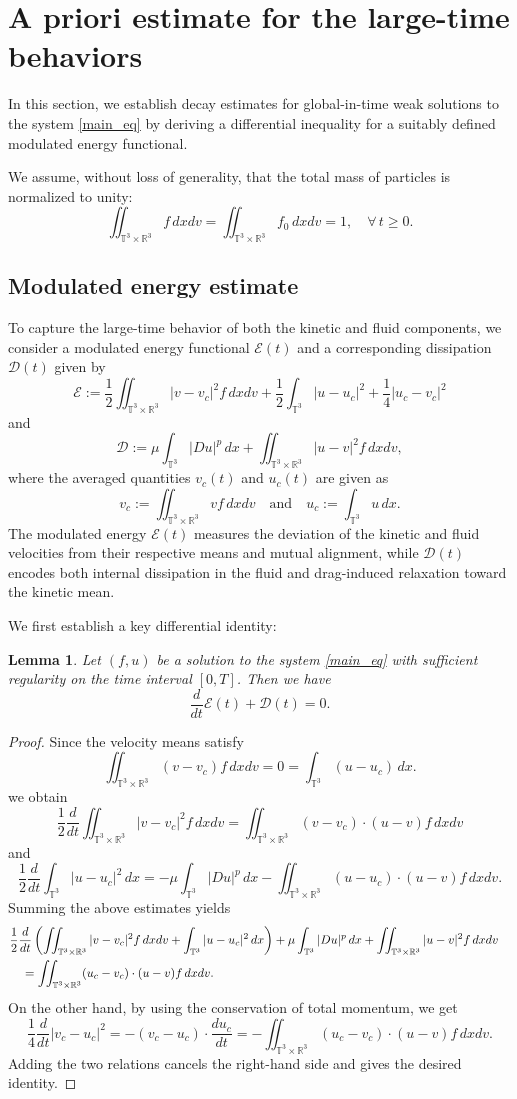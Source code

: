 \documentclass[10pt,reqno]{amsart}
\numberwithin{equation}{section}
\newtheorem{lemma}{Lemma}[section]
\newcommand{\R}{\mathbb R}
\newcommand{\T}{\mathbb T}
\newcommand{\lt}{\left}
\newcommand{\rt}{\right}
\newcommand{\calE}{\mathcal{E}}
\newcommand{\calD}{\mathcal{D}}
\newcommand{\intt}{\int_{\T^3}}
\newcommand{\inttr}{\iint_{\T^3 \times \R^3}}
\begin{document}
\section{A priori estimate for the large-time behaviors}\label{sec_lt}
In this section, we establish decay estimates for global-in-time weak solutions to the system \eqref{main_eq} by deriving a differential inequality for a suitably defined modulated energy functional.


We assume, without loss of generality, that the total mass of particles is normalized to unity:
\[
\inttr f\,dxdv = \inttr f_0\,dxdv = 1, \quad \forall\, t \geq 0.
\]

%
%
%
%
\subsection{Modulated energy estimate} 


To capture the large-time behavior of both the kinetic and fluid components, we consider a modulated energy functional $\calE(t)$ and a corresponding dissipation $\calD(t)$ given by
\[
\calE := \frac12\inttr |v - v_c|^2 f\,dxdv + \frac12\intt |u - u_c|^2 + \frac14|u_c - v_c|^2
\]
and  
\[
\calD:= \mu\intt | D u|^p \,dx + \inttr |u - v|^2 f\,dxdv,
\]
where the averaged quantities $v_c(t)$ and $u_c(t)$ are given as
\[
v_c := \inttr vf\,dxdv \quad \mbox{and} \quad u_c:= \intt u\,dx.
\]
The modulated energy $\calE(t)$ measures the deviation of the kinetic and fluid velocities from their respective means and mutual alignment, while $\calD(t)$ encodes both internal dissipation in the fluid and drag-induced relaxation toward the kinetic mean.

We first establish a key differential identity:

\begin{lemma} Let $(f,u)$ be a solution to the system \eqref{main_eq} with sufficient regularity on the time interval $[0,T]$. Then we have
\[
\frac{d}{dt} \calE(t) + \calD(t) = 0.
\]
\end{lemma}
\begin{proof}Since the velocity means satisfy
\[
\inttr (v - v_c)f\,dxdv = 0  = \intt (u - u_c)\,dx.
\]
we obtain
\[
\frac12 \frac{d}{dt} \inttr |v - v_c|^2 f\,dxdv = \inttr (v - v_c) \cdot (u-v)f\,dxdv
\] 
and
\[
\frac12 \frac{d}{dt} \intt | u - u_c|^2 \,dx = -  \mu \intt |D u|^p\,dx - \inttr (u - u_c) \cdot (u-v)f\,dxdv.
\]
Summing the above estimates yields
\begin{align*}
&\frac12\frac{d}{dt}\lt( \inttr |v - v_c|^2 f\,dxdv +  \intt | u - u_c|^2 \,dx  \rt) + \mu \intt |D u|^p\,dx +  \inttr |u - v|^2 f\,dxdv \cr
&\quad  = \inttr (u_c - v_c) \cdot (u-v)f\,dxdv.
\end{align*}
On the other hand, by using the conservation of total momentum, we get
\[
\frac14 \frac{d}{dt} | v_c - u_c|^2 = - (v_c - u_c) \cdot \frac{d u_c}{dt} =  -\inttr (u_c - v_c) \cdot (u-v)f\,dxdv.
\]
Adding the two relations cancels the right-hand side and gives the desired identity.
\end{proof}
\end{document}
